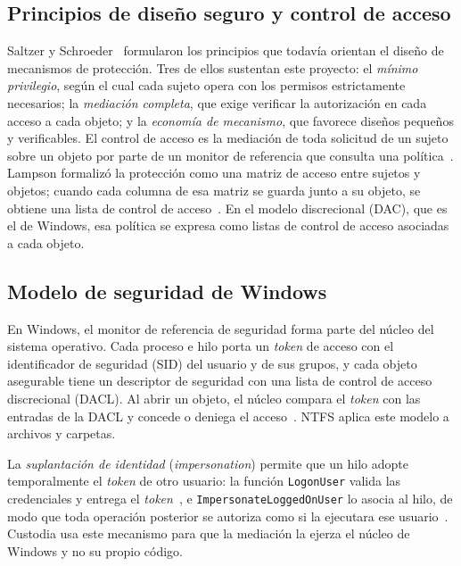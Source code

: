 \documentclass[conference]{IEEEtran}
\begin{document}
\subsection{Principios de diseño seguro y control de acceso}
Saltzer y Schroeder~\cite{saltzer} formularon los principios que todavía orientan el diseño de mecanismos de protección. Tres de ellos sustentan este proyecto: el \textit{mínimo privilegio}, según el cual cada sujeto opera con los permisos estrictamente necesarios; la \textit{mediación completa}, que exige verificar la autorización en cada acceso a cada objeto; y la \textit{economía de mecanismo}, que favorece diseños pequeños y verificables. El control de acceso es la mediación de toda solicitud de un sujeto sobre un objeto por parte de un monitor de referencia que consulta una política~\cite{sandhu}. Lampson formalizó la protección como una matriz de acceso entre sujetos y objetos; cuando cada columna de esa matriz se guarda junto a su objeto, se obtiene una lista de control de acceso~\cite{lampson}. En el modelo discrecional (DAC), que es el de Windows, esa política se expresa como listas de control de acceso asociadas a cada objeto.

\subsection{Modelo de seguridad de Windows}
En Windows, el monitor de referencia de seguridad forma parte del núcleo del sistema operativo. Cada proceso e hilo porta un \textit{token} de acceso con el identificador de seguridad (SID) del usuario y de sus grupos, y cada objeto asegurable tiene un descriptor de seguridad con una lista de control de acceso discrecional (DACL). Al abrir un objeto, el núcleo compara el \textit{token} con las entradas de la DACL y concede o deniega el acceso~\cite{winint,msacl}. NTFS aplica este modelo a archivos y carpetas.

La \textit{suplantación de identidad} (\textit{impersonation}) permite que un hilo adopte temporalmente el \textit{token} de otro usuario: la función \texttt{LogonUser} valida las credenciales y entrega el \textit{token}~\cite{mslogon}, e \texttt{ImpersonateLoggedOnUser} lo asocia al hilo, de modo que toda operación posterior se autoriza como si la ejecutara ese usuario~\cite{msimp}. Custodia usa este mecanismo para que la mediación la ejerza el núcleo de Windows y no su propio código.
\end{document}
